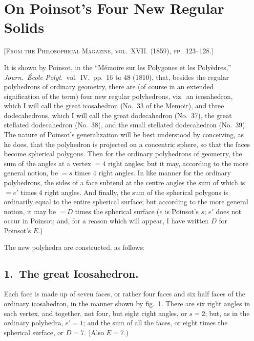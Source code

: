 \documentclass[11pt,a4paper]{article}
\begin{document}
\newpage


\section{On Poinsot's Four New Regular Solids}
\label{paper:241}

\textsc{[From the Philosophical Magazine, vol.~XVII. (1859), pp.~123--128.]}

\setcounter{page}{81}

It is shown by Poinsot, in the ``Mémoire sur les Polygones et les Polyèdres,'' \textit{Journ.\ École Polyt.}\ vol.~IV.\ pp.~16 to 48 (1810), that, besides the regular polyhedrons of ordinary geometry, there are (of course in an extended signification of the term) four new regular polyhedrons, viz.\ an icosahedron, which I will call the great icosahedron (No.\ 33 of the Memoir), and three dodecahedrons, which I will call the great dodecahedron (No.\ 37), the great stellated dodecahedron (No.\ 38), and the small stellated dodecahedron (No.\ 39). The nature of Poinsot's generalization will be best understood by conceiving, as he does, that the polyhedron is projected on a concentric sphere, so that the faces become spherical polygons. Then for the ordinary polyhedrons of geometry, the sum of the angles at a vertex $= 4$ right angles; but it may, according to the more general notion, be $= s$ times 4 right angles. In like manner for the ordinary polyhedrons, the sides of a face subtend at the centre angles the sum of which is $= e'$ times 4 right angles. And finally, the sum of the spherical polygons is ordinarily equal to the entire spherical surface; but according to the more general notion, it may be $= D$ times the spherical surface ($e$ is Poinsot's $s$; $e'$ does not occur in Poinsot; and, for a reason which will appear, I have written $D$ for Poinsot's $E$.)

The new polyhedra are constructed, as follows:

\subsection*{1.\ The great Icosahedron.}
Each face is made up of seven faces, or rather four faces and six half faces of the ordinary icosahedron, in the manner shown by fig.~1. There are six right angles in each vertex, and together, not four, but eight right angles, or $s=2$; but, as in the ordinary polyhedra, $e'=1$; and the sum of all the faces, or eight times the spherical surface, or $D=7$. (Also $E=7$.)
\end{document}
